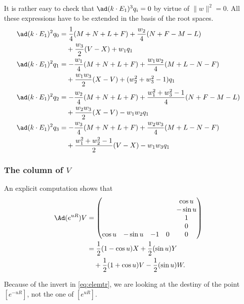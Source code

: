 It is rather easy to check that $\ad(k\cdot E_1)^3q_i=0$ by virtue of $\|w\|^2=0$. All these expressions have to be extended in the basis of the root spaces.
\begin{equation}
	\begin{split}
		\ad(k\cdot E_1)^2q_0 &=\frac{1}{4}(M+N+L+F)+\frac{w_2}{4}(N+F-M-L)\\
		&\quad +\frac{w_3}{2}(V-X)+w_1q_1\\
		\ad(k\cdot E_1)^2q_1 &=-\frac{w_1}{4}(M+N+L+F)+ \frac{w_1w_2}{4}(M+L-N-F)\\
		&\quad +\frac{w_1w_3}{2}(X-V) +(w_2^2+w_3^2-1)q_1\\
		\ad(k\cdot E_1)^2q_2 &=-\frac{w_2}{4}(M+N+L+F)+\frac{w_1^2+w_3^2-1}{4}(N+F-M-L)\\
		&\quad +\frac{w_2w_3}{2} (X-V)-w_1w_2q_1\\
		\ad(k\cdot E_1)^2q_3 &= -\frac{w_3}{4}(M+N+L+F) +\frac{w_2w_3}{4}(M+L-N-F)\\
		&\quad +\frac{w_1^2+w_2^2-1}{2}(V-X)-w_1w_3q_1
	\end{split}
\end{equation}


\subsubsection{The column of \texorpdfstring{$V$}{V}}

An explicit computation shows that
\begin{equation}
	\begin{split}
		\Ad(e^{uR})V&=
		\begin{pmatrix}
			       &         &    &   & \cos u  \\
			       &         &    &   & -\sin u \\
			       &         &    &   & 1       \\
			       &         &    &   & 0       \\
			\cos u & -\sin u & -1 & 0 & 0
		\end{pmatrix}\\
		&=\frac{1}{2}(1-\cos u)X+\frac{1}{2}(\sin u) Y\\
		&\quad+\frac{1}{2}(1+\cos u)V-\frac{1}{2}(\sin u) W.
	\end{split}
\end{equation}

\begin{remark}
	Because of the invert in \eqref{eq:elemtr}, we are looking at the destiny of the point $[e^{-uR}]$, not the one of $[e^{uR}]$.
\end{remark}

